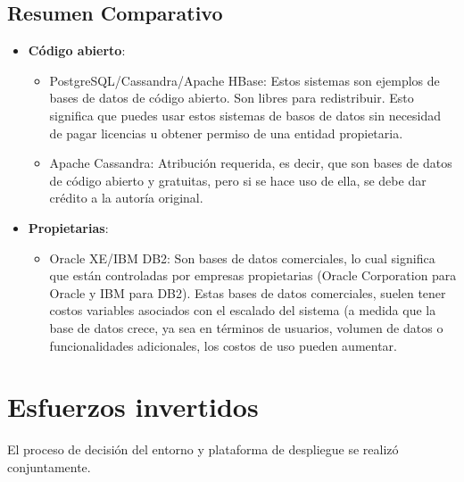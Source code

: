 \documentclass{article}
\begin{document}
\subsection{Resumen Comparativo}
\begin{itemize}
    \item \textbf{Código abierto}:
    \begin{itemize}
        \item PostgreSQL/Cassandra/Apache HBase: Estos sistemas son ejemplos de bases de datos de código abierto. Son libres para redistribuir. Esto significa que puedes usar estos sistemas de basos de datos sin necesidad de pagar licencias u obtener permiso de una entidad propietaria. 
        \item Apache Cassandra: Atribución requerida, es decir, que son bases de datos de código abierto y gratuitas, pero si se hace uso de ella, se debe dar crédito a la autoría original. 
    \end{itemize}
    
    \item \textbf{Propietarias}:
    \begin{itemize}
        \item Oracle XE/IBM DB2: Son bases de datos comerciales, lo cual significa que están controladas por empresas propietarias (Oracle Corporation para Oracle y IBM para DB2). Estas bases de datos comerciales, suelen tener costos variables asociados con el escalado del sistema (a medida que la base de datos crece, ya sea en términos de usuarios, volumen de datos o funcionalidades adicionales, los costos de uso pueden aumentar.
    \end{itemize}
\end{itemize}


\section{Esfuerzos invertidos}\label{sec:Esfuerzos invertidos}

El proceso de decisión del entorno y plataforma de despliegue se realizó conjuntamente. 
\end{document}
